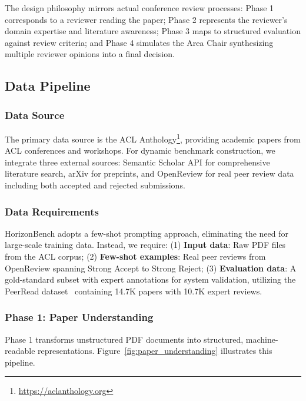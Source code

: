 The design philosophy mirrors actual conference review processes: Phase 1 corresponds to a reviewer reading the paper; Phase 2 represents the reviewer's domain expertise and literature awareness; Phase 3 maps to structured evaluation against review criteria; and Phase 4 simulates the Area Chair synthesizing multiple reviewer opinions into a final decision.

\subsection{Data Pipeline}

\subsubsection{Data Source}

The primary data source is the ACL Anthology\footnote{\url{https://aclanthology.org}}, providing academic papers from ACL conferences and workshops. For dynamic benchmark construction, we integrate three external sources: Semantic Scholar API for comprehensive literature search, arXiv for preprints, and OpenReview for real peer review data including both accepted and rejected submissions.

\subsubsection{Data Requirements}

HorizonBench adopts a few-shot prompting approach, eliminating the need for large-scale training data. Instead, we require: (1) \textbf{Input data}: Raw PDF files from the ACL corpus; (2) \textbf{Few-shot examples}: Real peer reviews from OpenReview spanning Strong Accept to Strong Reject; (3) \textbf{Evaluation data}: A gold-standard subset with expert annotations for system validation, utilizing the PeerRead dataset~\cite{kang2018peerread} containing 14.7K papers with 10.7K expert reviews.

\subsubsection{Phase 1: Paper Understanding}

Phase 1 transforms unstructured PDF documents into structured, machine-readable representations. Figure~\ref{fig:paper_understanding} illustrates this pipeline.

